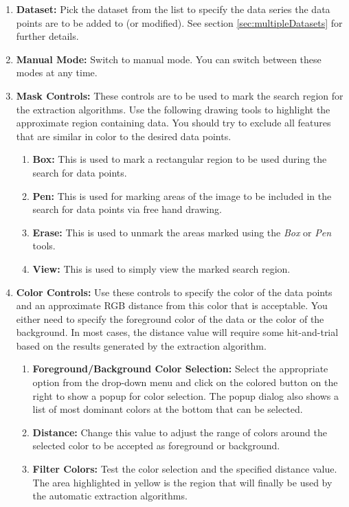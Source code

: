 \documentclass[letterpaper, 10pt]{article}
\begin{document}
\begin{enumerate}
\item{{\bf Dataset: }Pick the dataset from the list to specify the data series the data points are to be added to (or modified). See section \ref{sec:multipleDatasets} for further details.}
\item{{\bf Manual Mode: }Switch to manual mode. You can switch between these modes at any time.}
\item{{\bf Mask Controls:} These controls are to be used to mark the search region for the extraction algorithms. Use the following drawing tools to highlight the approximate region containing data. You should try to exclude all features that are similar in color to the desired data points.}
\begin{enumerate}
    \item{{\bf Box: }This is used to mark a rectangular region to be used during the search for data points.}
    \item{{\bf Pen: }This is used for marking areas of the image to be included in the search for data points via free hand drawing.}
    \item{{\bf Erase: }This is used to unmark the areas marked using the \emph{Box} or \emph{Pen} tools.}
    \item{{\bf View: }This is used to simply view the marked search region.}
\end{enumerate}
\item{{\bf Color Controls: } Use these controls to specify the color of the data points and an approximate RGB distance from this color that is acceptable. You either need to specify the foreground color of the data or the color of the background. In most cases, the distance value will require some hit-and-trial based on the results generated by the extraction algorithm.}
\begin{enumerate}
    \item{{\bf Foreground/Background Color Selection: }Select the appropriate option from the drop-down menu and click on the colored button on the right to show a popup for color selection. The popup dialog also shows a list of most dominant colors at the bottom that can be selected.}
    \item{{\bf Distance: }Change this value to adjust the range of colors around the selected color to be accepted as foreground or background.}
    \item{{\bf Filter Colors: }Test the color selection and the specified distance value. The area highlighted in yellow is the region that will finally be used by the automatic extraction algorithms.}

\end{enumerate}
\end{enumerate}
\end{document}
